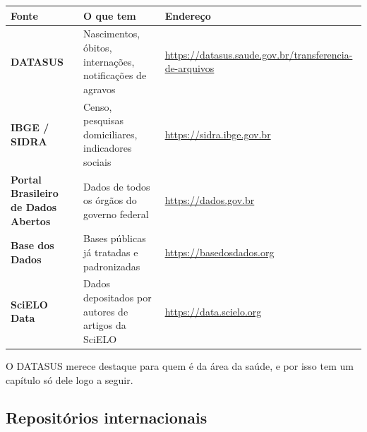 \documentclass[
]{book}
\newcounter{none} %
\begin{document}
{\def\LTcaptype{none} %
\begin{longtable}[]{@{}
  >{\raggedright\arraybackslash}p{}
  >{\raggedright\arraybackslash}p{}
  >{\raggedright\arraybackslash}p{}@{}}
\toprule\noalign{}
\begin{minipage}[b]{\linewidth}\raggedright
Fonte
\end{minipage} & \begin{minipage}[b]{\linewidth}\raggedright
O que tem
\end{minipage} & \begin{minipage}[b]{\linewidth}\raggedright
Endereço
\end{minipage} \\
\midrule\noalign{}
\endhead
\bottomrule\noalign{}
\endlastfoot
\textbf{DATASUS} & Nascimentos, óbitos, internações, notificações de agravos & \url{https://datasus.saude.gov.br/transferencia-de-arquivos} \\
\textbf{IBGE / SIDRA} & Censo, pesquisas domiciliares, indicadores sociais & \url{https://sidra.ibge.gov.br} \\
\textbf{Portal Brasileiro de Dados Abertos} & Dados de todos os órgãos do governo federal & \url{https://dados.gov.br} \\
\textbf{Base dos Dados} & Bases públicas já tratadas e padronizadas & \url{https://basedosdados.org} \\
\textbf{SciELO Data} & Dados depositados por autores de artigos da SciELO & \url{https://data.scielo.org} \\
\end{longtable}
}

O DATASUS merece destaque para quem é da área da saúde, e por isso tem um capítulo só dele logo a seguir.

\subsection{Repositórios internacionais}\label{reposituxf3rios-internacionais}
\end{document}
